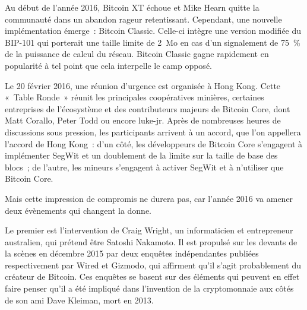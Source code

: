 Au début de l'année 2016, Bitcoin XT échoue et Mike Hearn quitte la communauté dans un abandon rageur retentissant. Cependant, une nouvelle implémentation émerge~: Bitcoin Classic. Celle-ci intègre une version modifiée du BIP-101 qui porterait une taille limite de 2~Mo en cas d'un signalement de 75~\% de la puissance de calcul du réseau. Bitcoin Classic gagne rapidement en popularité à tel point que cela interpelle le camp opposé.

Le 20 février 2016, une réunion d'urgence est organisée à Hong Kong. Cette «~Table Ronde~» réunit les principales coopératives minières, certaines entreprises de l'écosystème et des contributeurs majeurs de Bitcoin Core, dont Matt Corallo, Peter Todd ou encore luke-jr. Après de nombreuses heures de discussions sous pression, les participants arrivent à un accord, que l'on appellera l'accord de Hong Kong~: d'un côté, les développeurs de Bitcoin Core s'engagent à implémenter SegWit et un doublement de la limite sur la taille de base des blocs~; de l'autre, les mineurs s'engagent à activer SegWit et à n'utiliser que Bitcoin Core.

Mais cette impression de compromis ne durera pas, car l'année 2016 va amener deux évènements qui changent la donne.

Le premier est l'intervention de Craig Wright, un informaticien et entrepreneur australien, qui prétend être Satoshi Nakamoto. Il est propulsé sur les devants de la scènes en décembre 2015 par deux enquêtes indépendantes publiées respectivement par Wired et Gizmodo, qui affirment qu'il s'agit probablement du créateur de Bitcoin. Ces enquêtes se basent sur des éléments qui peuvent en effet faire penser qu'il a été impliqué dans l'invention de la cryptomonnaie aux côtés de son ami Dave Kleiman, mort en 2013.


